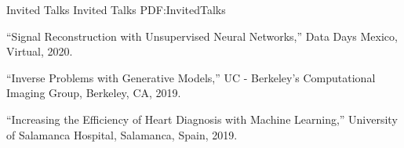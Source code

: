 \Section
{Invited Talks}
{Invited Talks}
{PDF:InvitedTalks}

\Gap\BulletItem
``Signal Reconstruction with Unsupervised Neural Networks,'' Data Days Mexico, Virtual, 2020.

\Gap\BulletItem
``Inverse Problems with Generative Models,'' UC - Berkeley's Computational Imaging Group, Berkeley, CA, 2019.

\Gap\BulletItem
``Increasing the Efficiency of Heart Diagnosis with Machine Learning,'' University of Salamanca Hospital, Salamanca, Spain, 2019.